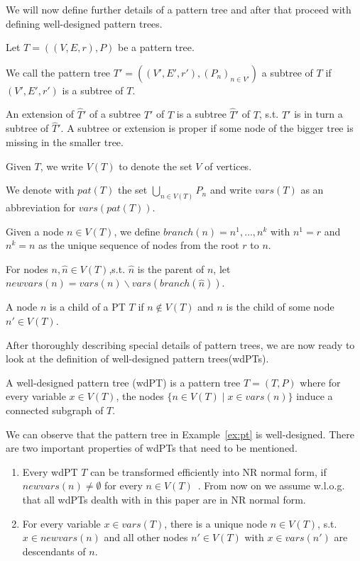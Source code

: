 We will now define further details of a pattern tree and after that
proceed with defining well-designed pattern trees.
\begin{definition}
Let $T = ((V,E,r), P)$ be a pattern tree.

We call the pattern tree $T' = ((V',E',r'), (P_n)_{n \in V'})$ a subtree of $T$
if $(V',E',r')$ is a subtree of $T$. 

An extension of $\hat{T}'$ of a subtree
$T'$ of $T$ is a subtree $\hat{T}'$ of $T$, s.t. $T'$ is in turn a subtree of
$\hat{T}'$. A subtree or extension is proper if some node of the bigger tree is
missing in the smaller tree.

Given $T$, we write $V(T)$ to denote the set $V$ of vertices.

We denote with $pat(T)$ the set $\bigcup_{n\in V(T)} P_n$ and write $vars(T)$ as an
abbreviation for $vars(pat(T))$.

Given a node $n \in V(T)$, we define $branch(n) = n^1, \dots, n^k$ with $n^1 = r$
and $n^k = n$ as the unique sequence of nodes from the root $r$ to $n$.

For nodes $n,\hat{n} \in V(T)$,s.t. $\hat{n}$ is the parent of $n$, let
$newvars(n) = vars(n) \backslash vars(branch(\hat{n}))$. 

A node $n$ is a child
of a PT $T$ if $n\notin V(T)$ and $n$ is the child of some node $n' \in V(T)$.
\end{definition}
After thoroughly describing special details of pattern trees, we are now ready
to look at the definition of well-designed pattern trees(wdPTs).
\begin{definition}
	A well-designed pattern tree (wdPT) is a pattern tree $T = (T,P)$ where for
	every variable $x \in V(T)$, the nodes $\{n \in V(T) \mid x \in vars(n)\}$
	induce a connected subgraph of $T$.
\end{definition}
We can observe that the pattern tree in Example~\ref{ex:pt} is well-designed.
There are two important properties of wdPTs that need to be mentioned. 
\begin{proposition}
	\begin{enumerate}	
		\item Every wdPT $T$ can be transformed efficiently into NR normal form, if $newvars(n) \neq
			\emptyset$ for every $n \in V(T)$~\cite{letelier2012static}. From now on we
			assume w.l.o.g. that all wdPTs dealth with in this paper are in NR normal form.
		\item For every variable $x \in vars (T)$, there is a unique node $n \in
			V(T)$, s.t. $x \in newvars(n)$ and all other nodes $n' \in V(T)$
			with $x \in vars(n')$ are descendants of
			$n$.~\cite{pichler2014containment}
	\end{enumerate}
\end{proposition}


